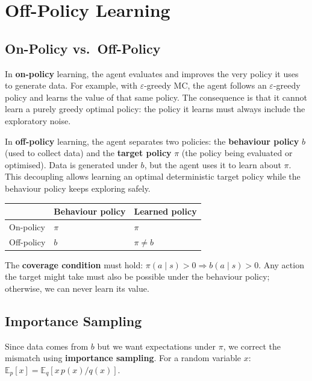 \documentclass[11pt,a4paper]{article}
\newcommand{\E}{\mathbb{E}}
\newcommand{\term}[1]{\textcolor{DefGreen}{\textbf{#1}}}
\begin{document}
\section{Off-Policy Learning}

\subsection{On-Policy vs.\ Off-Policy}

In \term{on-policy} learning, the agent evaluates and improves the very policy it uses to generate data. For example, with $\varepsilon$-greedy MC, the agent follows an $\varepsilon$-greedy policy and learns the value of that same policy. The consequence is that it cannot learn a purely greedy optimal policy: the policy it learns must always include the exploratory noise.

In \term{off-policy} learning, the agent separates two policies: the \term{behaviour policy} $b$ (used to collect data) and the \term{target policy} $\pi$ (the policy being evaluated or optimised). Data is generated under $b$, but the agent uses it to learn about $\pi$. This decoupling allows learning an optimal deterministic target policy while the behaviour policy keeps exploring safely.

\begin{tcolorbox}[colback=LightBlue,colframe=AccentBlue,boxrule=0.8pt,arc=3pt]
\begin{tabular}{@{}lll@{}}
\toprule
 & \textbf{Behaviour policy} & \textbf{Learned policy} \\
\midrule
On-policy & $\pi$ & $\pi$ \\
Off-policy & $b$ & $\pi \neq b$ \\
\bottomrule
\end{tabular}
\end{tcolorbox}

The \term{coverage condition} must hold: $\pi(a\mid s) > 0 \Rightarrow b(a\mid s) > 0$. Any action the target might take must also be possible under the behaviour policy; otherwise, we can never learn its value.

\subsection{Importance Sampling}

Since data comes from $b$ but we want expectations under $\pi$, we correct the mismatch using \term{importance sampling}. For a random variable $x$: $\E_p[x] = \E_q[x\, p(x)/q(x)]$.
\end{document}
